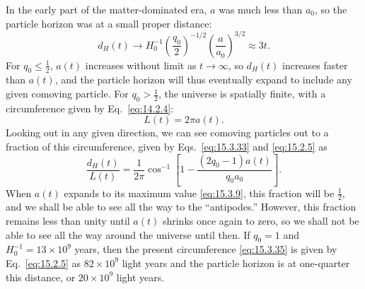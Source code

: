 In the early part of the matter-dominated era, \(a\) was much less than
\(a_0\), so the particle horizon was at a small proper distance:
\begin{equation}
  d_H(t)
  \longrightarrow
  H_0^{-1}
  \left(\frac{q_0}{2}\right)^{-1/2}
  \left(\frac{a}{a_0}\right)^{3/2}
  \approx3t.
  \tag{15.3.34}\label{eq:15.3.34}
\end{equation}
For \(q_0\le\tfrac12\), \(a(t)\) increases without limit as
\(t\to\infty\), so \(d_H(t)\) increases faster than \(a(t)\), and the
particle horizon will thus eventually expand to include any given comoving
particle. For \(q_0>\tfrac12\), the universe is spatially finite, with a
circumference given by Eq.~\eqref{eq:14.2.4}:
\begin{equation}
  L(t)=2\pi a(t).
  \tag{15.3.35}\label{eq:15.3.35}
\end{equation}
Looking out in any given direction, we can see comoving particles out to a
fraction of this circumference, given by Eqs.~\eqref{eq:15.3.33} and
\eqref{eq:15.2.5} as
\begin{equation}
  \frac{d_H(t)}{L(t)}
  =
  \frac1{2\pi}
  \cos^{-1}
  \left[
    1-\frac{(2q_0-1)a(t)}{q_0a_0}
  \right].
  \tag{15.3.36}\label{eq:15.3.36}
\end{equation}
When \(a(t)\) expands to its maximum value \eqref{eq:15.3.9}, this fraction
will be \(\tfrac12\), and we shall be able to see all the way to the
``antipodes.'' However, this fraction remains less than unity until \(a(t)\)
shrinks once again to zero, so we shall not be able to see all the way around
the universe until then. If \(q_0=1\) and
\(H_0^{-1}=13\times10^9\) years, then the present circumference
\eqref{eq:15.3.35} is given by Eq.~\eqref{eq:15.2.5} as
\(82\times10^9\) light years and the particle horizon is at one-quarter this
distance, or \(20\times10^9\) light years.

